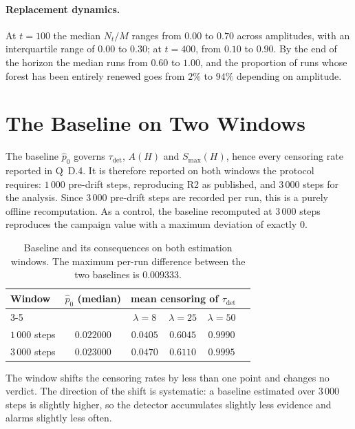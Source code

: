 \documentclass[11pt,a4paper]{article}
\begin{document}
\paragraph{Replacement dynamics.} At $t = 100$ the median $N_t/M$ ranges from $0.00$ to
$0.70$ across amplitudes, with an interquartile range of $0.00$ to $0.30$; at $t = 400$,
from $0.10$ to $0.90$. By the end of the horizon the median runs from $0.60$ to $1.00$,
and the proportion of runs whose forest has been entirely renewed goes from $2\%$ to
$94\%$ depending on amplitude.

\section{The Baseline on Two Windows}

The baseline $\hat p_0$ governs $\tau_{\mathrm{det}}$, $A(H)$ and $S_{\max}(H)$, hence
every censoring rate reported in Q~D.4. It is therefore reported on both windows the
protocol requires: $1\,000$ pre-drift steps, reproducing R2 as published, and $3\,000$
steps for the analysis. Since $3\,000$ pre-drift steps are recorded per run, this is a
purely offline recomputation. As a control, the baseline recomputed at $3\,000$ steps
reproduces the campaign value with a maximum deviation of exactly $0$.

\begin{table}[htbp]
  \centering
  \begin{tabular}{lccccc}
    \toprule
    Window & $\hat p_0$ (median) & \multicolumn{3}{c}{mean censoring of $\tau_{\mathrm{det}}$} \\
    \cmidrule(lr){3-5}
     & & $\lambda = 8$ & $\lambda = 25$ & $\lambda = 50$ \\
    \midrule
    $1\,000$ steps & $0.022000$ & $0.0405$ & $0.6045$ & $0.9990$ \\
    $3\,000$ steps & $0.023000$ & $0.0470$ & $0.6110$ & $0.9995$ \\
    \bottomrule
  \end{tabular}
  \caption{Baseline and its consequences on both estimation windows. The maximum per-run
  difference between the two baselines is $0.009333$.}
  \label{tab:socle}
\end{table}

The window shifts the censoring rates by less than one point and changes no verdict. The
direction of the shift is systematic: a baseline estimated over $3\,000$ steps is slightly
higher, so the detector accumulates slightly less evidence and alarms slightly less often.
\end{document}
